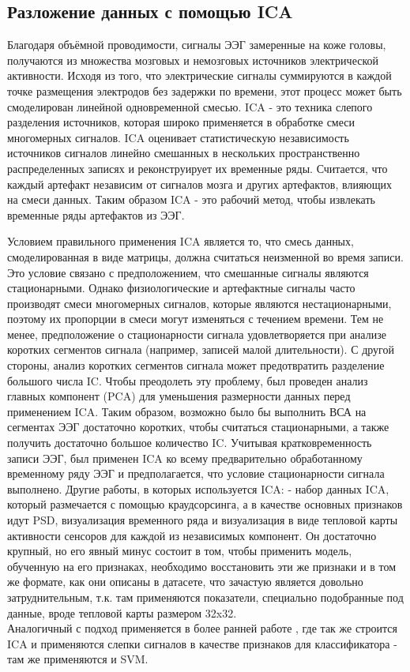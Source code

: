\documentclass[12pt, a4paper, titlepage]{extreport}
\begin{document}
	\subsection*{Разложение данных с помощью ICA}
	Благодаря объёмной проводимости, сигналы ЭЭГ замеренные на коже головы, получаются из множества мозговых и немозговых источников электрической активности. Исходя из того, что электрические сигналы суммируются в каждой точке размещения электродов без задержки по времени, этот процесс может быть смоделирован линейной одновременной смесью. ICA - это техника слепого разделения источников, которая широко применяется в обработке смеси многомерных сигналов. ICA оценивает статистическую независимость источников сигналов линейно смешанных в нескольких пространственно распределенных записях и реконструирует их временные ряды. Считается, что каждый артефакт независим от сигналов мозга и других артефактов, влияющих на смеси данных. Таким образом ICA - это рабочий метод, чтобы извлекать временные ряды артефактов из ЭЭГ.
	
	Условием правильного применения ICA является то, что смесь данных, смоделированная в виде матрицы, должна считаться неизменной во время записи. Это условие связано с предположением, что смешанные сигналы являются стационарными. Однако физиологические и артефактные сигналы часто производят смеси многомерных сигналов, которые являются нестационарными, поэтому их пропорции в смеси могут изменяться с течением времени. Тем не менее, предположение о стационарности сигнала удовлетворяется при анализе коротких сегментов сигнала (например, записей малой длительности).
	С другой стороны, анализ коротких сегментов сигнала может предотвратить разделение большого числа IC. Чтобы преодолеть эту проблему, был проведен анализ главных компонент (PCA) для уменьшения размерности данных перед применением ICA. Таким образом, возможно было бы выполнить ВСА на сегментах ЭЭГ достаточно коротких, чтобы считаться стационарными, а также получить достаточно большое количество IC. Учитывая кратковременность записи ЭЭГ, был применен ICA ко всему предварительно обработанному временному ряду ЭЭГ и предполагается, что условие стационарности сигнала выполнено.
	Другие работы, в которых используется ICA: \cite{32} - набор данных ICA, который размечается с помощью краудсорсинга, а в качестве основных признаков идут PSD, визуализация временного ряда и визуализация в виде тепловой карты активности сенсоров для каждой из независимых компонент. Он достаточно крупный, но его явный минус состоит в том, чтобы применить модель, обученную на его признаках, необходимо восстановить эти же признаки и в том же формате, как они описаны в датасете, что зачастую является довольно затруднительным, т.к. там применяются показатели, специально подобранные под данные, вроде тепловой карты размером 32x32.\\
	Аналогичный с \cite{30} подход применяется в более ранней работе \cite{33}, где так же строится ICA и применяются слепки сигналов в качестве признаков для классификатора - там же применяются и SVM.
\end{document}
